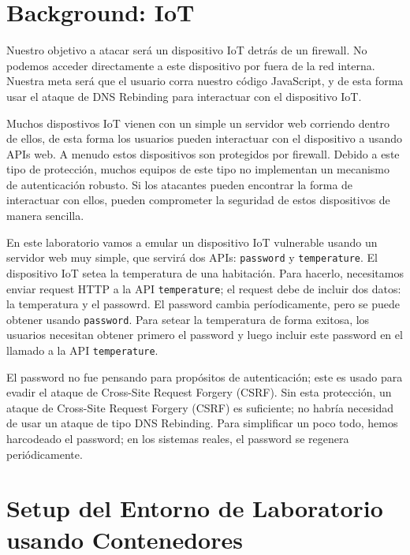 \section{Background: IoT}

Nuestro objetivo a atacar será un dispositivo IoT detrás de un firewall. No podemos acceder directamente a este dispositivo por fuera de la red interna. Nuestra meta será que el usuario corra nuestro código JavaScript, y de esta forma usar el ataque de DNS Rebinding para interactuar con el dispositivo IoT.

Muchos dispostivos IoT vienen con un simple un servidor web corriendo dentro de ellos, de esta forma los usuarios pueden interactuar con el dispositivo a usando APIs web. A menudo estos dispositivos son protegidos por firewall. Debido a este tipo de protección, muchos equipos de este tipo no implementan un mecanismo de autenticación robusto. Si los atacantes pueden encontrar la forma de interactuar con ellos, pueden comprometer la seguridad de estos dispositivos de manera sencilla.

En este laboratorio vamos a emular un dispositivo IoT vulnerable usando un servidor web muy simple, que servirá dos APIs:  \texttt{password} y \texttt{temperature}.
El dispositivo IoT setea la temperatura de una habitación. Para hacerlo, necesitamos enviar request HTTP a la API \texttt{temperature}; el request debe de incluir dos datos: la temperatura y el passowrd.
El password cambia períodicamente, pero se puede obtener usando \texttt{password}. Para setear la temperatura de forma exitosa, los usuarios necesitan obtener primero el password y luego incluir este password en el llamado a la API \texttt{temperature}.

El password no fue pensando para propósitos de autenticación; este es usado para evadir el ataque de Cross-Site Request Forgery (CSRF). Sin esta protección, un ataque de Cross-Site
Request Forgery (CSRF) es suficiente; no habría necesidad de usar un ataque de tipo DNS Rebinding.
Para simplificar un poco todo, hemos harcodeado el password; en los sistemas reales, el password se regenera periódicamente.



\section{Setup del Entorno de Laboratorio usando Contenedores}



